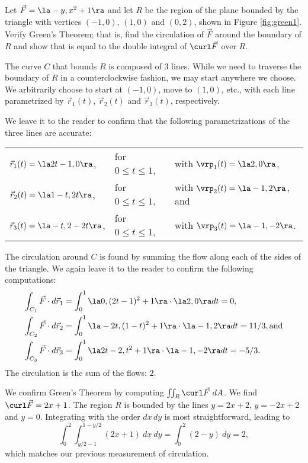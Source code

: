 {Let $\vec F =\la -y,x^2+1\ra$ and let $R$ be the region of the plane bounded by the triangle with vertices $(-1,0)$, $(1,0)$ and $(0,2)$, shown in Figure \ref{fig:green1}. Verify Green's Theorem; that is, find the circulation of $\vec F$ around the boundary of $R$ and show that is equal to the double integral of $\curl \vec F$ over $R$.
}
{The curve $C$ that bounds $R$ is composed of 3 lines. While we need to traverse the boundary of $R$ in a counterclockwise fashion, we may start anywhere we choose. We arbitrarily choose to start at $(-1,0)$, move to $(1,0)$, etc., with each line parametrized by $\vec r_1(t)$, $\vec r_2(t)$ and $\vec r_3(t)$, respectively.

We leave it to the reader to confirm that the following parametrizations of the three lines are accurate:

\begin{tabular}{lll}
$\vec r_1(t) = \la 2t-1,0\ra$,& for $0\leq t\leq 1$,& with $\vrp_1(t) = \la 2,0\ra$,\\
$\vec r_2(t) = \la 1-t,2t\ra$,& for $0\leq t\leq 1$,& with $\vrp_2(t) = \la -1,2\ra$, and\\
$\vec r_3(t) = \la -t,2-2t\ra$,& for $0\leq t\leq 1$,& with $\vrp_3(t) = \la -1,-2\ra$.
\end{tabular}

The circulation around $C$ is found by summing the flow along each of the sides of the triangle. We again leave it to the reader to confirm the following computations:
\begin{align*}
\int_{C_1}\vec F\cdot d\vec r_1 &= \int_0^1 \la 0,(2t-1)^2+1\ra\cdot \la 2,0\ra dt = 0,\\
\int_{C_2}\vec F\cdot d\vec r_2 &= \int_0^1 \la -2t,(1-t)^2+1\ra\cdot \la -1,2\ra dt = 11/3, \text{and}\\
\int_{C_3}\vec F\cdot d\vec r_3 &= \int_0^1 \la 2t-2,t^2+1\ra\cdot \la -1,-2\ra dt = -5/3.
\end{align*}
The circulation is the sum of the flows: $2$.

We confirm Green's Theorem by computing $\iint_R \curl \vec F\ dA$. We find $\curl \vec F = 2x+1$. The region $R$ is bounded by the lines $y = 2x+2$, $y=-2x+2$ and $y=0$. Integrating with the order $dx\, dy$ is most straightforward, leading to
$$\int_0^2\int_{y/2-1}^{1-y/2} (2x+1)\ dx\ dy = \int_0^2 (2-y)\ dy = 2,$$
which matches our previous measurement of circulation. 
}\\

